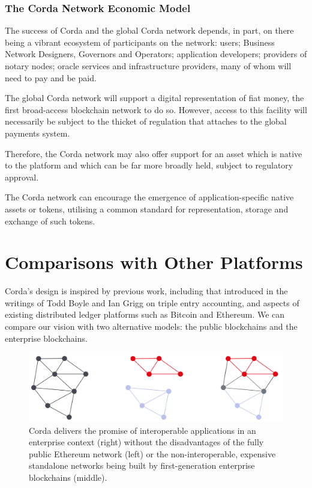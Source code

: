 \documentclass{article}
\begin{document}
\subsubsection {The Corda Network Economic Model}

The success of Corda and the global Corda network depends, in part, on there being a vibrant ecosystem of participants on the network: users; Business Network Designers, Governors and Operators; application developers; providers of notary nodes; oracle services and infrastructure providers, many of whom will need to pay and be paid.

The global Corda network will support a digital representation of fiat money, the first broad-access blockchain network to do so. However, access to this facility will necessarily be subject to the thicket of regulation that attaches to the global payments system.

Therefore, the Corda network may also offer support for an asset which is native to the platform and which can be far more broadly held, subject to regulatory approval.

The Corda network can encourage the emergence of application-specific native assets or tokens, utilising a common standard for representation, storage and exchange of such tokens.

\section{Comparisons with Other Platforms}
Corda's design is  inspired by previous work, including that introduced in the writings of Todd Boyle and Ian Grigg on triple entry accounting\cite{Triple}, and aspects of existing distributed ledger platforms such as Bitcoin\cite{Bitcoin} and Ethereum. We can compare our vision with two alternative models: the public blockchains and the enterprise blockchains.

\begin{figure}[H]
    \includegraphics[scale = .5, center]{platform-comparisons}
    \caption{Corda delivers the promise of interoperable applications in an enterprise context (right) without the disadvantages of the fully public Ethereum network (left) or the non-interoperable, expensive standalone networks being built by first-generation enterprise blockchains (middle).}
\end{figure}
\end{document}
